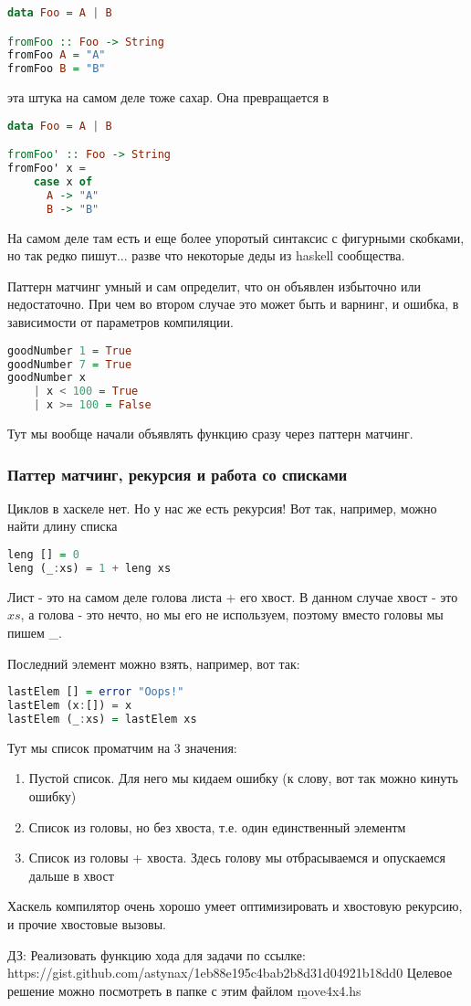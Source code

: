 \documentclass[10pt, a4paper]{article}
\begin{document}
\begin{lstlisting}[language=haskell]
data Foo = A | B

fromFoo :: Foo -> String 
fromFoo A = "A"
fromFoo B = "B"
\end{lstlisting}

эта штука на самом деле тоже сахар. Она превращается в 

\begin{lstlisting}[language=haskell]
data Foo = A | B

fromFoo' :: Foo -> String 
fromFoo' x = 
    case x of
      A -> "A"
      B -> "B"
\end{lstlisting}

На самом деле там есть и еще более упоротый синтаксис с фигурными скобками, но так редко пишут... разве что некоторые деды из haskell сообщества.

Паттерн матчинг умный и сам определит, что он объявлен избыточно или недостаточно. При чем во втором случае это может быть и варнинг, и ошибка, в зависимости от параметров компиляции.

\begin{lstlisting}[language=haskell]
goodNumber 1 = True
goodNumber 7 = True
goodNumber x 
    | x < 100 = True
    | x >= 100 = False 
\end{lstlisting}

Тут мы вообще начали объявлять функцию сразу через паттерн матчинг.

\subsubsection{Паттер матчинг, рекурсия и работа со списками}
Циклов в хаскеле нет. Но у нас же есть рекурсия! Вот так, например, можно найти длину списка
\begin{lstlisting}[language=haskell]
leng [] = 0
leng (_:xs) = 1 + leng xs 
\end{lstlisting}

Лист - это на самом деле голова листа + его хвост. В данном случае хвост - это $xs$, а голова - это нечто, но мы его не используем, поэтому вместо головы мы пишем \_.

Последний элемент можно взять, например, вот так:
\begin{lstlisting}[language=haskell]
lastElem [] = error "Oops!"
lastElem (x:[]) = x
lastElem (_:xs) = lastElem xs
\end{lstlisting}

Тут мы список проматчим на 3 значения:
\begin{enumerate}
	\item Пустой список. Для него мы кидаем ошибку (к слову, вот так можно кинуть ошибку)
	\item Список из головы, но без хвоста, т.е. один единственный элементм
	\item Список из головы + хвоста. Здесь голову мы отбрасываемся и опускаемся дальше в хвост
\end{enumerate}

Хаскель компилятор очень хорошо умеет оптимизировать и хвостовую рекурсию, и прочие хвостовые вызовы.

ДЗ: Реализовать функцию хода для задачи по ссылке: https://gist.github.com/astynax/1eb88e195c4bab2b8d31d04921b18dd0
Целевое решение можно посмотреть в папке с этим файлом {\b move4x4.hs}
\end{document}
